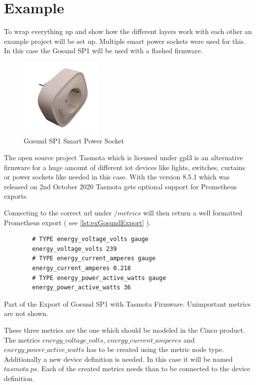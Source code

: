 \section{Example}
To wrap everything up and show how the different layers work with each other an example project will be set up. Multiple smart power sockets were used for this. In this case the Gosund SP1 will be used with a flashed firmware.
\begin{figure}[H]
	\centering
	\includegraphics[width=4cm]{assets/images/gosund.png}
	\caption{Gosund SP1 Smart Power Socket}
\end{figure}
The open source project Tasmota \cite{tasmotawebsite} which is licensed under \gls{gpl3} is an alternative firmware for a huge amount of different \gls{iot} devices like lights, switches, curtains or power sockets like needed in this case.
With the version 8.5.1 which was released on 2nd October 2020 Tasmota gets optional support for Prometheus exports. 

Connecting to the correct \gls{url} under $/metrics$ will then return a well formatted Prometheus export ( see \ref{lst:exGosundExport} ).

\begin{listing}[H]
	\begin{verbatim}
		# TYPE energy_voltage_volts gauge
		energy_voltage_volts 239
		# TYPE energy_current_amperes gauge
		energy_current_amperes 0.218
		# TYPE energy_power_active_watts gauge
		energy_power_active_watts 36
	\end{verbatim}
	\caption{Part of the Export of Gosund SP1 with Tasmota Firmware. Unimportant metrics are not shown.}
	\label{lst:exGosundExport}
\end{listing}

These three metrics are the one which should be modeled in the Cinco product. The metrics $energy\_voltage\_volts$, $energy\_current\_amperes$ and $energy\_power\_active\_watts$ has to be created using the metric node type. Additionally a new device definition is needed. In this case it will be named $tasmota\ ps$. Each of the created metrics needs than to be connected to the device definition.

